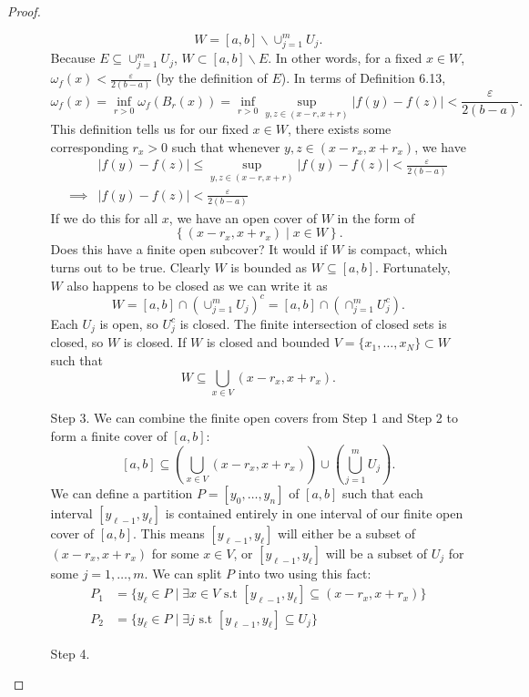 \documentclass{article}
\newcommand{\abs}[1]{\left\lvert#1\right\rvert}
\newcommand{\brc}[1]{ \left\{#1\right\} }
\newcommand{\paren}[1]{ \left(#1\right) }
\theoremstyle{definition}
\begin{document}
\begin{proof}
\begin{enumerate}
\begin{enumerate}
				$$ W=[a,b]\backslash\cup_{j=1}^m U_j. $$ Because $ E \subseteq \cup_{j=1}^m U_j $, $ W \subset [a,b]\backslash E $. In other words, for a fixed $ x\in W $, $ \omega_f(x)<\frac{\varepsilon}{2(b-a)} $ (by the definition of $ E $). In terms of Definition 6.13, 
				$$ \omega_f(x)= \inf_{r > 0}\omega_f(B_r(x))= \inf_{r > 0}\sup_{y,z\in (x-r,x+r)}\abs{f(y)-f(z)}<\frac{\varepsilon}{2(b-a)}.$$
				This definition tells us for our fixed $ x\in W $, there exists some corresponding $ r_x > 0 $ such that whenever $ y,z\in (x-r_x,x+r_x) $, we have 
				\begin{align*}
					&  \abs{f(y)-f(z)}\le \sup_{y,z\in (x-r,x+r)}\abs{f(y)-f(z)} < \frac{\varepsilon}{2(b-a)}\\
					\implies &  \abs{f(y)-f(z)}< \frac{\varepsilon}{2(b-a)}
				\end{align*}
				If we do this for all $ x $, we have an open cover of $ W $ in the form of $$\brc{(x-r_x,x+r_x)\mid x \in W}.$$ Does this have a finite open subcover? It would if $ W $ is compact, which turns out to be true. Clearly $ W $ is bounded as $ W \subseteq [a,b] $. Fortunately, $ W $ also happens to be closed as we can write it as 
				$$ W = [a,b] \cap \paren{\cup_{j=1}^m U_j}^c = [a,b] \cap \paren{\cap_{j=1}^m U_j^c}.$$ Each $ U_j $ is open, so $ U_j^c $ is closed. The finite intersection of closed sets is closed, so $ W $ is closed. If $ W $ is closed and bounded $V= \{x_1,\ldots, x_N\}\subset W $ such that 
				$$ W\subseteq \bigcup_{x\in V}(x - r_{x}, x+ r_{x}).$$
				\item [Step 3.] We can combine the finite open covers from Step 1 and Step 2 to form a finite cover of $ [a,b] $:
				$$ [a,b]\subseteq \left(\bigcup_{x\in V}(x - r_{x}, x+ r_{x})\right)\cup \left(\bigcup_{j=1}^m U_j\right).$$ We can define a partition $ P=[y_0,\ldots,y_n] $ of $ [a,b] $ such that each interval $ [y_{\ell-1},y_\ell] $ is contained entirely in one interval of our finite open cover of $ [a,b] $. This means  $  [y_{\ell-1},y_\ell] $ will either be a subset of $ (x-r_x,x+r_x) $ for some $ x\in V $, or $  [y_{\ell-1},y_\ell] $ will be a subset of $ U_j $ for some $ j=1,\ldots,m $. We can split $ P $ into two using this fact:
				\begin{align*}
					P_1 &= \{y_\ell \in P \mid \exists x\in V\text{ s.t }[y_{\ell-1},y_\ell]\subseteq (x-r_x,x+r_x)\}\\
					P_2 &= \{y_\ell \in P \mid \exists j\text{ s.t }[y_{\ell-1},y_\ell]\subseteq U_j\}
				\end{align*}
			\item[Step 4.] {\tiny
}
\end{enumerate}
\end{enumerate}
\end{proof}
\end{document}
